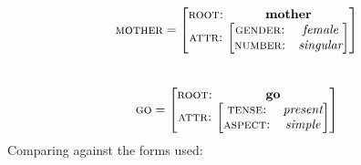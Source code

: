 \documentclass[12pt,a4paper]{article}
\begin{document}
	\[
\textsc{mother}=
\begin{bmatrix}
\textsc{root:} & \mspace{-12mu} \begin{matrix} \textbf{mother} \end{matrix} \\
\begin{matrix} \textsc{attr:} \end{matrix} &
\mspace{-12mu}
\begin{bmatrix}
  \textsc{gender:} & \textit{female}\\
  \textsc{number:} & \textit{singular}\\
\end{bmatrix}
\end{bmatrix}
\]\\
\[
\textsc{go}=
\begin{bmatrix}
\textsc{root:} & \mspace{-12mu} \begin{matrix} \textbf{go} \end{matrix} \\
\begin{matrix} \textsc{attr:} \end{matrix} &
\mspace{-12mu}
\begin{bmatrix}
  \textsc{tense:} & \textit{present}\\
  \textsc{aspect:} & \textit{simple}\\
\end{bmatrix}
\end{bmatrix}
\]
		Comparing against the forms used:\\
		
\end{document}
